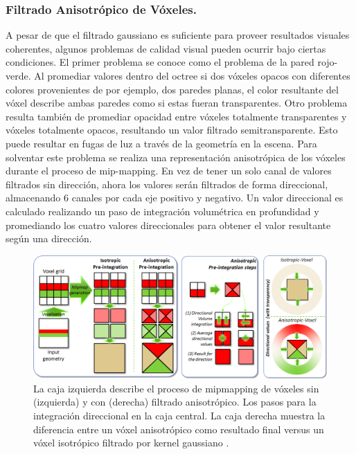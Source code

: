 \subsubsection{Filtrado Anisotrópico de Vóxeles.}
A pesar de que el filtrado gaussiano es suficiente para proveer resultados visuales coherentes, algunos problemas de calidad visual pueden ocurrir bajo ciertas condiciones. El primer problema se conoce como el problema de la pared rojo-verde. Al promediar valores dentro del octree si dos vóxeles opacos con diferentes colores provenientes de por ejemplo, dos paredes planas, el color resultante del vóxel describe ambas paredes como si estas fueran transparentes. Otro problema resulta también de promediar opacidad entre vóxeles totalmente transparentes y vóxeles totalmente opacos, resultando un valor filtrado semitransparente. Esto puede resultar en fugas de luz a través de la geometría en la escena.
Para solventar este problema se realiza una representación anisotrópica de los vóxeles durante el proceso de mip-mapping. En vez de tener un solo canal de valores filtrados sin dirección, ahora los valores serán filtrados de forma direccional, almacenando 6 canales por cada eje positivo y negativo. Un valor direccional es calculado realizando un paso de integración volumétrica en profundidad y promediando los cuatro valores direccionales para obtener el valor resultante según una dirección.

\begin{figure}[H]
	\centering
	\includegraphics[width=0.95\linewidth]{media/image23177.png}
	\caption{La caja izquierda describe el proceso de mipmapping de vóxeles sin (izquierda) y con (derecha) filtrado anisotrópico. Los pasos para la integración direccional en la caja central. La caja derecha muestra la diferencia entre un vóxel anisotrópico como resultado final versus un vóxel isotrópico filtrado por kernel gaussiano \cite{CNSGE11b}.}
	\label{fig:vct_anisofiltering}
\end{figure}

